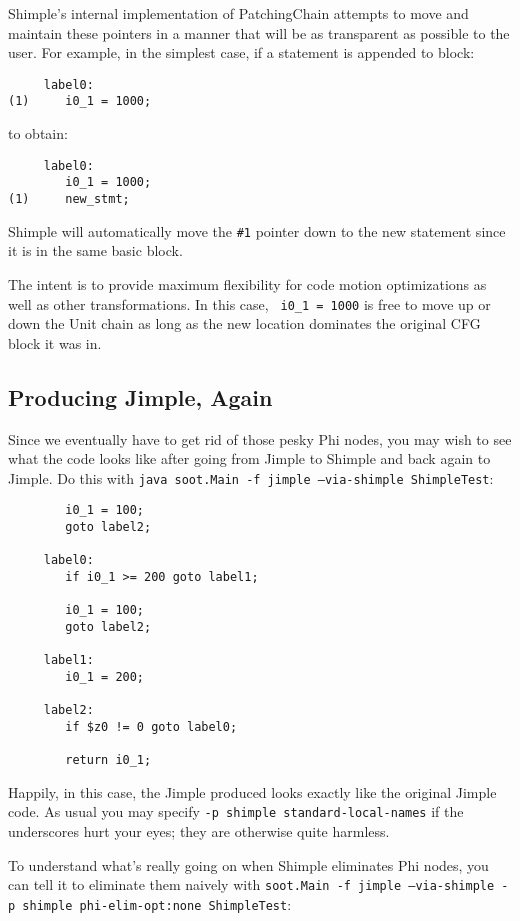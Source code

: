 \documentclass[10pt,letterpaper,oneside,onecolumn]{article}
\begin{document}
Shimple's internal implementation of PatchingChain attempts to move
and maintain these pointers in a manner that will be as transparent as
possible to the user.  For example, in the simplest case, if a
statement is appended to block:

\begin{verbatim}
     label0:
(1)     i0_1 = 1000;
\end{verbatim}

to obtain:

\begin{verbatim}
     label0:
        i0_1 = 1000;
(1)     new_stmt;
\end{verbatim}

Shimple will automatically move the {\tt \#1} pointer down to the new
statement since it is in the same basic block.

The intent is to provide maximum flexibility for code motion
optimizations as well as other transformations.  In this case, {\tt
i0\_1 = 1000} is free to move up or down the Unit chain as long as the
new location dominates the original CFG block it was in.

\subsection{Producing Jimple, Again}

Since we eventually have to get rid of those pesky Phi nodes, you
may wish to see what the code looks like after going from Jimple to
Shimple and back again to Jimple.  Do this with {\tt java soot.Main -f
jimple --via-shimple ShimpleTest}:

\begin{verbatim}
        i0_1 = 100;
        goto label2;

     label0:
        if i0_1 >= 200 goto label1;

        i0_1 = 100;
        goto label2;

     label1:
        i0_1 = 200;

     label2:
        if $z0 != 0 goto label0;

        return i0_1;
\end{verbatim}

Happily, in this case, the Jimple produced looks exactly like the
original Jimple code.  As usual you may specify {\tt -p shimple
standard-local-names} if the underscores hurt your eyes; they are
otherwise quite harmless.

To understand what's really going on when Shimple eliminates Phi
nodes, you can tell it to eliminate them naively with {\tt soot.Main
-f jimple --via-shimple -p shimple phi-elim-opt:none ShimpleTest}:
\end{document}
